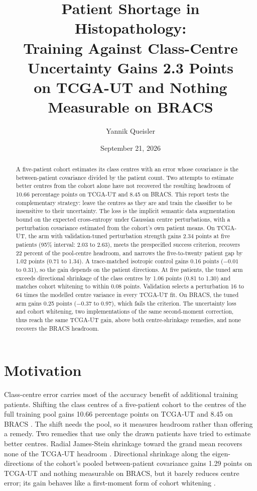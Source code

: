 \documentclass[11pt]{article}
\title{Patient Shortage in Histopathology:\\Training Against Class-Centre Uncertainty Gains 2.3 Points\\on TCGA-UT and Nothing Measurable on BRACS}
\author{Yannik Queisler}
\date{September 21, 2026}
\begin{document}
\raggedbottom
{}
\setlength{\emergencystretch}{2em}
\maketitle
\begin{abstract}
\noindent A five-patient cohort estimates its class centres with an error whose covariance is the between-patient covariance divided by the patient count. Two attempts to estimate better centres from the cohort alone have not recovered the resulting headroom of 10.66 percentage points on TCGA-UT and 8.45 on BRACS. This report tests the complementary strategy: leave the centres as they are and train the classifier to be insensitive to their uncertainty. The loss is the implicit semantic data augmentation bound on the expected cross-entropy under Gaussian centre perturbations, with a perturbation covariance estimated from the cohort's own patient means. On TCGA-UT, the arm with validation-tuned perturbation strength gains 2.34 points at five patients (95\% interval: 2.03 to 2.63), meets the prespecified success criterion, recovers 22 percent of the pool-centre headroom, and narrows the five-to-twenty patient gap by 1.02 points (0.71 to 1.34). A trace-matched isotropic control gains 0.16 points ($-0.01$ to 0.31), so the gain depends on the patient directions. At five patients, the tuned arm exceeds directional shrinkage of the class centres by 1.06 points (0.81 to 1.30) and matches cohort whitening to within 0.08 points. Validation selects a perturbation 16 to 64 times the modelled centre variance in every TCGA-UT fit. On BRACS, the tuned arm gains 0.25 points ($-0.37$ to 0.97), which fails the criterion. The uncertainty loss and cohort whitening, two implementations of the same second-moment correction, thus reach the same TCGA-UT gain, above both centre-shrinkage remedies, and none recovers the BRACS headroom.
\end{abstract}

\section{Motivation}
\label{sec:motivation}
Class-centre error carries most of the accuracy benefit of additional training patients. Shifting the class centres of a five-patient cohort to the centres of the full training pool gains 10.66 percentage points on TCGA-UT and 8.45 on BRACS \citep{queisler2026centreError,queisler2026bracsMechanism}. The shift needs the pool, so it measures headroom rather than offering a remedy. Two remedies that use only the drawn patients have tried to estimate better centres. Radial James-Stein shrinkage toward the grand mean recovers none of the TCGA-UT headroom \citep{queisler2026centreShrinkage}. Directional shrinkage along the eigen-directions of the cohort's pooled between-patient covariance gains 1.29 points on TCGA-UT and nothing measurable on BRACS, but it barely reduces centre error; its gain behaves like a first-moment form of cohort whitening \citep{queisler2026directionalShrinkage}.
\end{document}
